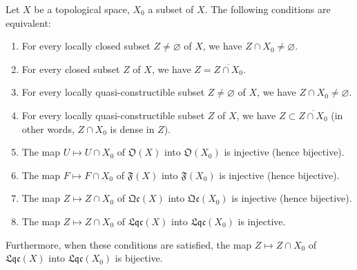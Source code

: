 \begin{proposition}[10.1.2]
\label{IV.10.1.2}
Let $X$ be a topological space, $X_0$ a subset of $X$.
The following conditions are equivalent:
\begin{enumerate}[label=\emph{\alph*)}]
  \item For every locally closed subset $Z\neq\varnothing$ of $X$, we have $Z\cap X_0\neq\varnothing$.
  \item[\rm a$'$)] For every closed subset $Z$ of $X$, we have $Z=\overline{Z\cap X_0}$.
  \item For every locally quasi-constructible subset $Z\neq\varnothing$ of $X$, we have $Z\cap X_0\neq\varnothing$.
  \item[\rm b$'$)] For every locally quasi-constructible subset $Z$ of $X$, we have $Z\subset\overline{Z\cap X_0}$ (in other words, $Z\cap X_0$ is dense in $Z$).
  \item The map $U\mapsto U\cap X_0$ of $\mathfrak{O}(X)$ into $\mathfrak{O}(X_0)$ is injective (hence bijective).
  \item[\rm c$'$)] The map $F\mapsto F\cap X_0$ of $\mathfrak{F}(X)$ into $\mathfrak{F}(X_0)$ is injective (hence bijective).
  \item[\rm c$''$)] The map $Z\mapsto Z\cap X_0$ of $\mathfrak{Qc}(X)$ into $\mathfrak{Qc}(X_0)$ is injective (hence bijective).
  \item[\rm c$'''$)] The map $Z\mapsto Z\cap X_0$ of $\mathfrak{Lqc}(X)$ into $\mathfrak{Lqc}(X_0)$ is injective.
\end{enumerate}
Furthermore, when these conditions are satisfied, the map $Z\mapsto Z\cap X_0$ of $\mathfrak{Lqc}(X)$ into $\mathfrak{Lqc}(X_0)$ is bijective.
\end{proposition}

